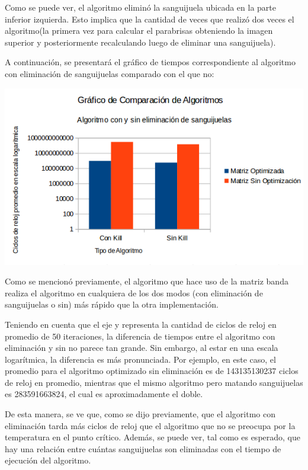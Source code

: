 	\par 
	Como se puede ver, el algoritmo eliminó la sanguijuela ubicada en la parte inferior izquierda. Esto implica que la cantidad de veces que realizó dos veces el algoritmo(la primera vez para calcular el parabrisas obteniendo la imagen superior y posteriormente recalculando luego de eliminar una sanguijuela). 
	\par 
	A continuación, se presentará el gráfico de tiempos correspondiente al algoritmo con eliminación de sanguijuelas comparado con el que no:
\par 	
	\begin{center}
		\includegraphics[scale=0.5]{./img/comparacionkill.png}
	\end{center}
	
	\par 
	Como se mencionó previamente, el algoritmo que hace uso de la matriz banda realiza el algoritmo en cualquiera de los dos modos (con eliminación de sanguijuelas o sin) más rápido que la otra implementación. 
	\par 
	Teniendo en cuenta que el eje y representa la cantidad de ciclos de reloj en promedio de 50 iteraciones, la diferencia de tiempos entre el algoritmo con eliminación y sin no parece tan grande. Sin embargo, al estar en una escala logarítmica, la diferencia es más pronunciada. Por ejemplo, en este caso, el promedio para el algoritmo optimizado sin eliminación es de 143135130237 ciclos de reloj en promedio, mientras que el mismo algoritmo pero matando sanguijuelas es 283591663824, el cual es aproximadamente el doble.
	
	\par 
	De esta manera, se ve que, como se dijo previamente, que el algoritmo con eliminación tarda más ciclos de reloj que el algoritmo que no se preocupa por la temperatura en el punto crítico. Además, se puede ver, tal como es esperado, que hay una relación entre cuántas sanguijuelas son eliminadas con el tiempo de ejecución del algoritmo. 
	
